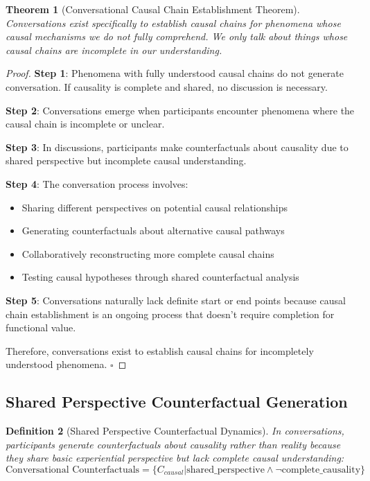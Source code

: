 \documentclass[11pt,a4paper]{article}
\newtheorem{theorem}{Theorem}[section]
\newtheorem{definition}[theorem]{Definition}
\begin{document}
\begin{theorem}[Conversational Causal Chain Establishment Theorem]
Conversations exist specifically to establish causal chains for phenomena whose causal mechanisms we do not fully comprehend. We only talk about things whose causal chains are incomplete in our understanding.
\end{theorem}

\begin{proof}
\textbf{Step 1}: Phenomena with fully understood causal chains do not generate conversation. If causality is complete and shared, no discussion is necessary.

\textbf{Step 2}: Conversations emerge when participants encounter phenomena where the causal chain is incomplete or unclear.

\textbf{Step 3}: In discussions, participants make counterfactuals about causality due to shared perspective but incomplete causal understanding.

\textbf{Step 4}: The conversation process involves:
\begin{itemize}
\item Sharing different perspectives on potential causal relationships
\item Generating counterfactuals about alternative causal pathways
\item Collaboratively reconstructing more complete causal chains
\item Testing causal hypotheses through shared counterfactual analysis
\end{itemize}

\textbf{Step 5}: Conversations naturally lack definite start or end points because causal chain establishment is an ongoing process that doesn't require completion for functional value.

Therefore, conversations exist to establish causal chains for incompletely understood phenomena. $\square$
\end{proof}

\subsection{Shared Perspective Counterfactual Generation}

\begin{definition}[Shared Perspective Counterfactual Dynamics]
In conversations, participants generate counterfactuals about causality rather than reality because they share basic experiential perspective but lack complete causal understanding:
\begin{equation}
\text{Conversational Counterfactuals} = \{C_{causal} | \text{shared\_perspective} \land \neg\text{complete\_causality}\}
\end{equation}
\end{definition}
\end{document}
